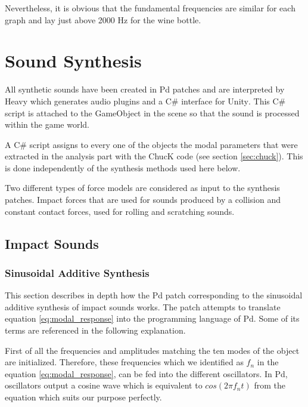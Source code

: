 Nevertheless, it is obvious that the fundamental frequencies are similar for each graph and lay just above 2000 Hz for the wine bottle.

\section{Sound Synthesis}\label{sec:synthesis_implem}

All synthetic sounds have been created in \gls{Pd} patches and are interpreted by Heavy which generates audio plugins and a C\# interface for Unity\textsuperscript{\textregistered}. This C\# script is attached to the GameObject in the scene so that the sound is processed within the game world.

A C\# script assigns to every one of the objects the modal parameters that were extracted in the analysis part with the ChucK code (see section \ref{sec:chuck}). This is done independently of the synthesis methods used here below.

Two different types of force models are considered as input to the synthesis patches. Impact forces that are used for sounds produced by a collision and constant contact forces, used for rolling and scratching sounds.

\subsection{Impact Sounds}\label{sec:impact_synth}
%
\subsubsection{Sinusoidal Additive Synthesis}\label{sec:sinusoidal_synth}

This section describes in depth how the \gls{Pd} patch corresponding to the sinusoidal additive synthesis of impact sounds works. The patch attempts to translate equation \ref{eq:modal_response} into the programming language of \gls{Pd}. Some of its terms are referenced in the following explanation.

First of all the frequencies and amplitudes matching the ten modes of the object are initialized. Therefore, these frequencies which we identified as $f_n$ in the equation \ref{eq:modal_response}, can be fed into the different oscillators. In \gls{Pd}, oscillators output a cosine wave which is equivalent to $cos(2 \pi f_nt)$ from the equation which suits our purpose perfectly.

